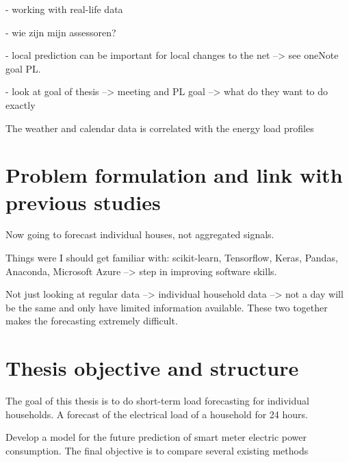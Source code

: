 - working with real-life data

- wie zijn mijn assessoren? 

- local prediction can be important for local changes to the net --> see oneNote goal PL.

- look at goal of thesis --> meeting and PL goal --> what do they want to do exactly

The weather and calendar data is correlated with the energy load profiles

\section{Problem formulation and link with previous studies}
Now going to forecast individual houses, not aggregated signals. 

Things were I should get familiar with: scikit-learn, Tensorflow, Keras, Pandas, Anaconda, Microsoft Azure --> step in improving software skills.

Not just looking at regular data --> individual household data --> not a day will be the same and only have limited information available. These two together makes the forecasting extremely difficult. 


\section{Thesis objective and structure}
The goal of this thesis is to do short-term load forecasting for individual households. A forecast of the electrical load of a household for 24 hours. 

Develop a model for the future prediction of smart meter electric power consumption. The final
objective is to compare several existing methods

